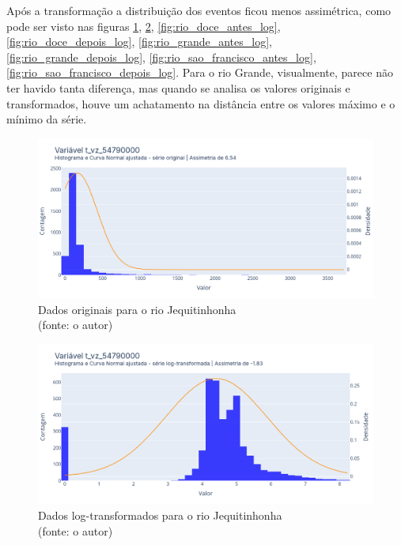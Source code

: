 Após a transformação a distribuição dos eventos ficou menos assimétrica, como pode ser visto nas figuras \ref{fig:jequitinhonha_antes_log}, \ref{fig:jequitinhonha_depois_log}, \ref{fig:rio_doce_antes_log}, \ref{fig:rio_doce_depois_log}, \ref{fig:rio_grande_antes_log}, \ref{fig:rio_grande_depois_log}, \ref{fig:rio_sao_francisco_antes_log}, \ref{fig:rio_sao_francisco_depois_log}. Para o rio Grande, visualmente, parece não ter havido tanta diferença, mas quando se analisa os valores originais e transformados, houve um achatamento na distância entre os valores máximo e o mínimo da série.

\begin{figure}[!h]
	\centering
	\includegraphics[scale=0.33]{Figuras/jequiti/jequitinhonha_antes_log.png}
	\caption{Dados originais para o rio Jequitinhonha\\(fonte: o autor)}
	\label{fig:jequitinhonha_antes_log}
\end{figure}

\begin{figure}[!h]
	\centering
	\includegraphics[scale=0.33]{Figuras/jequiti/jequitinhonha_depois_log.png}
	\caption{Dados log-transformados para o rio Jequitinhonha\\(fonte: o autor)}
	\label{fig:jequitinhonha_depois_log}
\end{figure}

